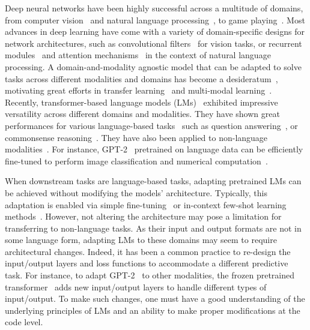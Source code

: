 Deep neural networks have been highly successful across a multitude of domains, from computer vision~\citep{forsyth2011computer,dosovitskiy2020image} and natural language processing~\citep{chowdhary2020natural,bommasani2021opportunities}, to game playing~\citep{wang2016does,arulkumaran2019alphastar}. Most advances in deep learning have come with a variety of domain-specific designs for network architectures, such as convolutional filters~\citep{lo1995artificial,he2016deep,he2017mask} for vision tasks, or recurrent modules~\citep{rumelhart1985learning,hochreiter1997long} and attention mechanisms~\citep{vaswani2017attention,so2019evolved} in the context of natural language processing. A domain-and-modality agnostic model that can be adapted to solve tasks across different modalities and domains has become a desideratum~\citep{kaiser2017one}, motivating great efforts in transfer learning~\citep{weiss2016survey} and multi-modal learning~\citep{ramachandram2017deep}. Recently, transformer-based language models (LMs)~\citep{so2019evolved,collobert2008gpt2,lu2021pretrained,brown2020gpt3} exhibited impressive versatility across different domains and modalities. They have shown great performances for various language-based tasks~\citep{li2021quantifying} such as question answering~\citep{radford2019language,su-etal-2019-generalizing}, or commonsense reasoning~\citep{zhou2019common}. They have also been applied to non-language modalities~\citep{lu2021pretrained}. For instance, GPT-2~\citep{collobert2008gpt2} pretrained on language data can be efficiently fine-tuned to perform image classification and numerical computation~\citep{lu2021pretrained}.

When downstream tasks are language-based tasks, adapting pretrained LMs can be achieved without modifying the models' architecture. Typically, this adaptation is enabled via simple fine-tuning~\citep{hu2021lora,houlsby2019parameter,rebuffi2017learning,wang2020k} or in-context few-shot learning methods~\citep{lu2021fantastically,min2021recent}. However, not altering the architecture may pose a limitation for transferring to non-language tasks. As their input and output formats are not in some language form, adapting LMs to these domains may seem to require architectural changes. Indeed, it has been a common practice to re-design the input/output layers and loss functions to accommodate a different predictive task. For instance, to adapt GPT-2~\citep{radford2019language} to other modalities, the frozen pretrained transformer~\citep{lu2021pretrained} adds new input/output layers to handle different types of input/output. To make such changes, one must have a good understanding of the underlying principles of LMs and an ability to make proper modifications at the code level. 

